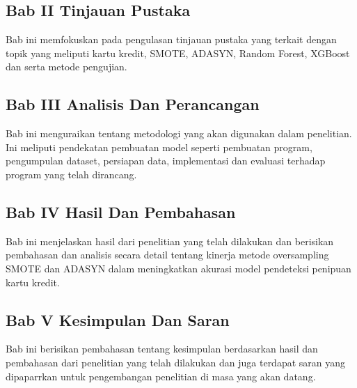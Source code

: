 \subsection{Bab II Tinjauan Pustaka}
Bab ini memfokuskan pada pengulasan tinjauan pustaka yang terkait dengan topik yang meliputi kartu kredit, SMOTE, ADASYN, Random Forest, XGBoost dan serta metode pengujian.
\subsection{Bab III Analisis Dan Perancangan}
Bab ini menguraikan tentang metodologi yang akan digunakan dalam penelitian. Ini meliputi pendekatan pembuatan model seperti pembuatan program, pengumpulan dataset, persiapan data, implementasi dan evaluasi terhadap program yang telah dirancang.
\subsection{Bab IV Hasil Dan Pembahasan}
Bab ini menjelaskan hasil dari penelitian yang telah dilakukan dan berisikan pembahasan dan analisis secara detail tentang kinerja metode oversampling SMOTE dan ADASYN dalam meningkatkan akurasi model pendeteksi penipuan kartu kredit.
\subsection{Bab V Kesimpulan Dan Saran}
Bab ini berisikan pembahasan tentang kesimpulan berdasarkan hasil dan pembahasan dari penelitian yang telah dilakukan dan juga terdapat saran yang dipaparrkan untuk pengembangan penelitian di masa yang akan datang. 

